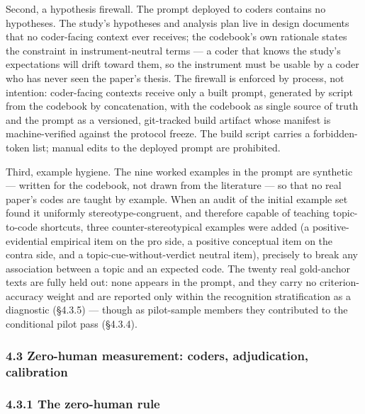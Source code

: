 Second, a hypothesis firewall. The prompt deployed to coders contains no hypotheses. The study's hypotheses and analysis plan live in design documents that no coder-facing context ever receives; the codebook's own rationale states the constraint in instrument-neutral terms --- a coder that knows the study's expectations will drift toward them, so the instrument must be usable by a coder who has never seen the paper's thesis. The firewall is enforced by process, not intention: coder-facing contexts receive only a built prompt, generated by script from the codebook by concatenation, with the codebook as single source of truth and the prompt as a versioned, git-tracked build artifact whose manifest is machine-verified against the protocol freeze. The build script carries a forbidden-token list; manual edits to the deployed prompt are prohibited.

Third, example hygiene. The nine worked examples in the prompt are synthetic --- written for the codebook, not drawn from the literature --- so that no real paper's codes are taught by example. When an audit of the initial example set found it uniformly stereotype-congruent, and therefore capable of teaching topic-to-code shortcuts, three counter-stereotypical examples were added (a positive-evidential empirical item on the pro side, a positive conceptual item on the contra side, and a topic-cue-without-verdict neutral item), precisely to break any association between a topic and an expected code. The twenty real gold-anchor texts are fully held out: none appears in the prompt, and they carry no criterion-accuracy weight and are reported only within the recognition stratification as a diagnostic (\S{}4.3.5) --- though as pilot-sample members they contributed to the conditional pilot pass (\S{}4.3.4).

\subsubsection{4.3 Zero-human measurement: coders, adjudication, calibration}\label{zero-human-measurement-coders-adjudication-calibration}

\subsubsection{4.3.1 The zero-human rule}\label{the-zero-human-rule}

